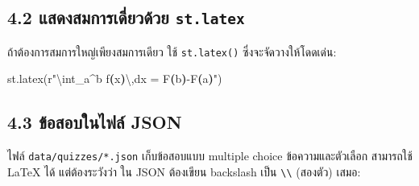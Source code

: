 \documentclass[
  thai,
  12pt,
  letterpaper,
  DIV=11,
  numbers=noendperiod]{scrartcl}
\newenvironment{Shaded}{\begin{snugshade}}{\end{snugshade}}
\newcommand{\CharTok}[1]{\textcolor[rgb]{0.13,0.47,0.30}{#1}}
\newcommand{\DataTypeTok}[1]{\textcolor[rgb]{0.68,0.00,0.00}{#1}}
\newcommand{\DecValTok}[1]{\textcolor[rgb]{0.68,0.00,0.00}{#1}}
\newcommand{\ErrorTok}[1]{\textcolor[rgb]{0.68,0.00,0.00}{#1}}
\newcommand{\FunctionTok}[1]{\textcolor[rgb]{0.28,0.35,0.67}{#1}}
\newcommand{\KeywordTok}[1]{\textcolor[rgb]{0.00,0.23,0.31}{\textbf{#1}}}
\newcommand{\NormalTok}[1]{\textcolor[rgb]{0.00,0.23,0.31}{#1}}
\newcommand{\OtherTok}[1]{\textcolor[rgb]{0.00,0.23,0.31}{#1}}
\newcommand{\StringTok}[1]{\textcolor[rgb]{0.13,0.47,0.30}{#1}}
\newcommand{\VerbatimStringTok}[1]{\textcolor[rgb]{0.13,0.47,0.30}{#1}}
\begin{document}
\subsection{\texorpdfstring{4.2 แสดงสมการเดี่ยวด้วย
\texttt{st.latex}}{4.2 แสดงสมการเดี่ยวด้วย st.latex}}\label{uxe41uxe2auxe14uxe07uxe2auxe21uxe01uxe32uxe23uxe40uxe14uxe22uxe27uxe14uxe27uxe22-st.latex}

ถ้าต้องการสมการใหญ่เพียงสมการเดียว ใช้ \texttt{st.latex()} ซึ่งจะจัดวางให้โดดเด่น:

\begin{Shaded}
\begin{Highlighting}[]
\NormalTok{st.latex(}\VerbatimStringTok{r"}\ErrorTok{\textbackslash{}}\VerbatimStringTok{int\_a}\DecValTok{\^{}}\VerbatimStringTok{b f}\KeywordTok{(}\VerbatimStringTok{x}\KeywordTok{)}\CharTok{\textbackslash{},}\VerbatimStringTok{dx = F}\KeywordTok{(}\VerbatimStringTok{b}\KeywordTok{)}\VerbatimStringTok{{-}F}\KeywordTok{(}\VerbatimStringTok{a}\KeywordTok{)}\VerbatimStringTok{"}\NormalTok{)}
\end{Highlighting}
\end{Shaded}

\subsection{4.3 ข้อสอบในไฟล์
JSON}\label{uxe02uxe2duxe2auxe2duxe1auxe43uxe19uxe44uxe1fuxe25-json}

ไฟล์ \texttt{data/quizzes/*.json} เก็บข้อสอบแบบ multiple choice
ข้อความและตัวเลือก สามารถใช้ LaTeX ได้ แต่ต้องระวังว่า ใน JSON ต้องเขียน backslash
เป็น \texttt{\textbackslash{}\textbackslash{}} (สองตัว) เสมอ:

\begin{Shaded}
\end{Shaded}
\end{document}
